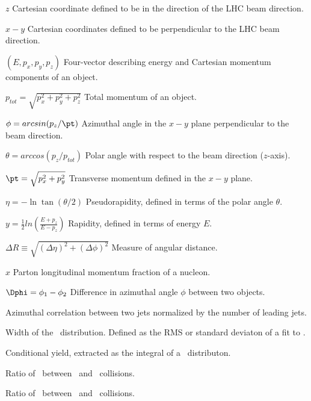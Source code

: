 
\begin{symbollist*}
\item[$z$] Cartesian coordinate defined to be in the direction of the LHC beam direction.
\item[$x-y$] Cartesian coordinates defined to be perpendicular to the LHC beam direction.
\item[$(E, p_{x}, p_{y}, p_{z})$] Four-vector describing energy and Cartesian momentum components of an object.
\item[$p_{tot} = \sqrt{p_{x}^{2} + p_{y}^{2} + p_{z}^{2}}$] Total momentum of an object.
\item[$\phi=arcsin(p_{z}/\pt)$] Azimuthal angle in the $x-y$ plane perpendicular to the beam direction.
\item[$\theta = arccos(p_{z}/p_{tot})$] Polar angle with respect to the beam direction ($z$-axis).
\item[$\pt=\sqrt{p_{x}^{2}+p_{y}^{2}}$] Transverse momentum defined in the $x-y$ plane.
\item[$\eta=-\ln\tan(\theta/2)$] Pseudorapidity, defined in terms of the polar angle $\theta$.
\item[$y=\frac{1}{2}ln(\frac{E+p_{z}}{E-p_{z}})$] Rapidity, defined in terms of energy $E$.
\item[$\Delta R \equiv \sqrt{(\Delta\eta)^{2} + (\Delta\phi)^{2}}$] Measure of angular distance.
\item[$x$] Parton longitudinal momentum fraction of a nucleon.
\item[$\Dphi=\phi_{1}-\phi_{2}$] Difference in azimuthal angle $\phi$ between two objects.
\item[\conetwo] Azimuthal correlation between two jets normalized by the number of leading jets.
\item[\wonetwo] Width of the \conetwo\ distribution. Defined as the RMS or standard deviaton of a fit to \conetwo.
\item[\ionetwo] Conditional yield, extracted as the integral of a \conetwo\ distributon. \
\item[\cppb] Ratio of \wonetwo\ between \pp\ and \pPb\ collisions.
\item[\ippb] Ratio of \ionetwo\ between \pp\ and \pPb\ collisions.
\end{symbollist*}

